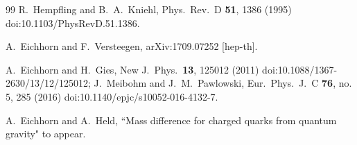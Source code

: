\documentclass[%
 reprint,
 superscriptaddress,
preprintnumbers,
nofootinbib,
 amsmath,amssymb,
 aps,
prl,
]{revtex4-1}
\begin{document}
\begin{thebibliography}{99}
  R.~Hempfling and B.~A.~Kniehl,
  Phys.\ Rev.\ D {\bf 51}, 1386 (1995)
  doi:10.1103/PhysRevD.51.1386.
 
  A.~Eichhorn and F.~Versteegen,
  arXiv:1709.07252 [hep-th].
  
  A.~Eichhorn and H.~Gies,
  New J.\ Phys.\  {\bf 13}, 125012 (2011)
  doi:10.1088/1367-2630/13/12/125012;
  J.~Meibohm and J.~M.~Pawlowski,
  Eur.\ Phys.\ J.\ C {\bf 76}, no. 5, 285 (2016)
  doi:10.1140/epjc/s10052-016-4132-7.
  
  A.~Eichhorn and A.~Held,
  ``Mass difference for charged quarks from quantum gravity"
  to appear.
  
\end{thebibliography}
  
  
\end{document}
